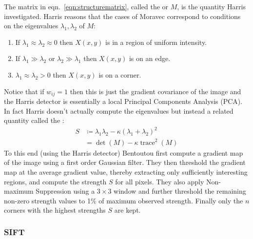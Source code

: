 %
The matrix in eqn.~\eqref{eqn:structurematrix}, called the  or  \(M\), is the quantity Harris investigated.
%
Harris reasons that the cases of Moravec correspond to conditions on the eigenvalues \(\lambda_1, \lambda_2\) of \(M\):
\begin{mdframed}
	\begin{enumerate}
		\item If \(\lambda_1 \approx \lambda_2 \approx 0\) then \(X(x,y)\) is in a region of uniform intensity.
		\item If \(\lambda_1 \gg \lambda_2\) or \(\lambda_2 \gg \lambda_1\) then \(X(x,y)\) is on an edge.
		\item \(\lambda_1 \approx \lambda_2 > 0\) then \(X(x,y)\) is on a corner.
	\end{enumerate}
\end{mdframed}
Notice that if \(w_{ij} = 1\) then this is just the gradient covariance of the image and the Harris detector is essentially a local Principal Components Analysis (PCA).
%
In fact Harris doesn't actually compute the eigenvalues but instead a related quantity called the :
\begin{align}
	S & \coloneqq \lambda_1 \lambda_2 - \kappa (\lambda_1 + \lambda_2)^2 \\
	  & = \det(M) - \kappa \operatorname{trace}^2(M)
	\label{eqn:strength}
\end{align}
%
To this end (using the Harris detector) Bentoutou \etal first compute a gradient map of the image using a first order Gaussian filter.
%
They then threshold the gradient map at the average gradient value, thereby extracting only sufficiently interesting regions, and compute the strength \(S\) for all pixels.
%
They also apply Non-maximum Suppression using a \(3 \times 3\) window and further threshold the remaining non-zero strength values to 1\% of maximum observed strength.
%
Finally only the \(n\) corners with the highest strengths \(S\) are kept.

\subsubsection{SIFT}\label{sec:sift}

